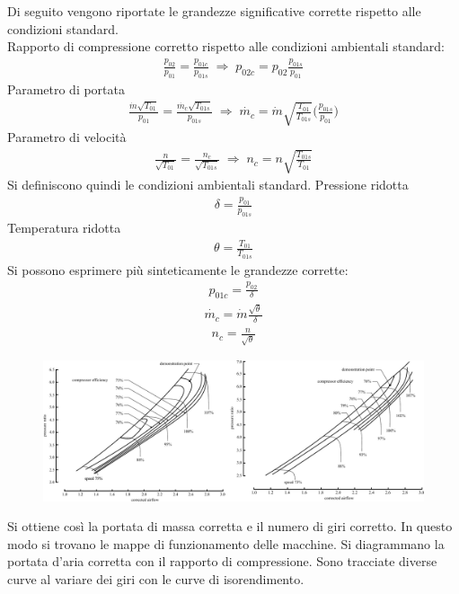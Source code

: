 Di seguito vengono riportate le grandezze significative corrette rispetto alle condizioni standard.\\
Rapporto di compressione corretto rispetto alle condizioni ambientali standard:
\begin{align*}
\frac{p_{02}}{p_{01}} = \frac{p_{01c}}{p_{01s}} \; \Rightarrow \; p_{02c} = p_{02}\frac{p_{01s}}{p_{01}}
\end{align*}
Parametro di portata
\begin{align*}
\frac{\dot{m}\sqrt{T_{01}}}{p_{01}}=\frac{\dot{m_c}\sqrt{T_{01s}}}{p_{01s}} \; \Rightarrow \; \dot{m_c} = \dot{m} \sqrt{\frac{T_{01}}{T_{01s}}} \bigg(\frac{p_{01s}}{p_{01}} \bigg)
\end{align*}
Parametro di velocità
\begin{align*}
\frac{n}{\sqrt{T_{01}}}=\frac{n_c}{\sqrt{T_{01s}}} \; \Rightarrow \; n_c = n \sqrt{\frac{T_{01s}}{T_{01}}}
\end{align*}
Si definiscono quindi le condizioni ambientali standard.
Pressione ridotta
\begin{align*}
\delta = \frac{p_{01}}{p_{01s}}
\end{align*}
Temperatura ridotta
\begin{align*}
\theta = \frac{T_{01}}{T_{01s}}
\end{align*}
Si possono esprimere più sinteticamente le grandezze corrette:
\begin{align*}
p_{01c} = \frac{p_{02}}{\delta}
\end{align*}
\begin{align*}
\dot{m_c}= \dot{m} \frac{\sqrt{\theta}}{\delta}
\end{align*}
\begin{align*}
n_c = \frac{n}{\sqrt{\theta}}
\end{align*}
\begin{figure}
\centering
  \includegraphics[width=\textwidth]{fig/CompMaps.pdf}
\caption{}
\label{}
\end{figure}
Si ottiene così la portata di massa corretta e il numero di giri corretto.
In questo modo si trovano le mappe di funzionamento delle macchine. Si diagrammano la portata d'aria corretta con il rapporto di compressione. Sono tracciate diverse curve al variare dei giri con le curve di isorendimento.

